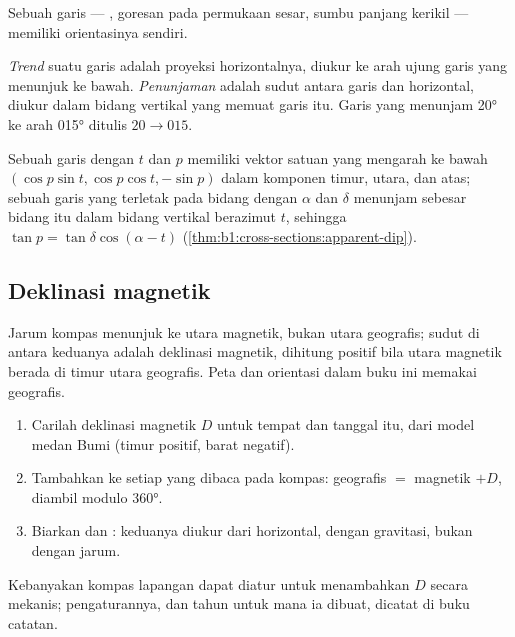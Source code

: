Sebuah garis --- , goresan pada permukaan sesar, sumbu panjang kerikil --- memiliki orientasinya sendiri.

\begin{definition}\label{def:b1:field-lab-methods-1:trend-plunge}
\emph{Trend} suatu garis adalah  proyeksi horizontalnya, diukur ke arah ujung garis yang menunjuk ke bawah. \emph{Penunjaman} adalah sudut antara garis dan horizontal, diukur dalam bidang vertikal yang memuat garis itu. Garis yang menunjam \ang{20} ke arah \ang{015} ditulis $20\to015$.
\end{definition}

Sebuah garis dengan  $t$ dan  $p$ memiliki vektor satuan yang mengarah ke bawah $(\cos p\sin t, \cos p\cos t, -\sin p)$ dalam komponen timur, utara, dan atas; sebuah garis yang terletak pada bidang dengan  $\alpha$ dan  $\delta$ menunjam sebesar  bidang itu dalam bidang vertikal berazimut $t$, sehingga $\tan p = \tan\delta\cos(\alpha - t)$ (\cref{thm:b1:cross-sections:apparent-dip}).

\subsection{Deklinasi magnetik}

Jarum kompas menunjuk ke utara magnetik, bukan utara geografis; sudut di antara keduanya adalah deklinasi magnetik, dihitung positif bila utara magnetik berada di timur utara geografis. Peta dan orientasi dalam buku ini memakai  geografis.

\begin{method}\label{met:b1:field-lab-methods-1:declination}
\begin{enumerate}
  \item Carilah deklinasi magnetik $D$ untuk tempat dan tanggal itu, dari model medan Bumi (timur positif, barat negatif).
  \item Tambahkan ke setiap  yang dibaca pada kompas:  geografis $=$  magnetik $+ D$, diambil modulo \ang{360}.
  \item Biarkan  dan : keduanya diukur dari horizontal, dengan gravitasi, bukan dengan jarum.
\end{enumerate}
Kebanyakan kompas lapangan dapat diatur untuk menambahkan $D$ secara mekanis; pengaturannya, dan tahun untuk mana ia dibuat, dicatat di buku catatan.
\end{method}

